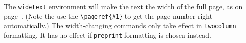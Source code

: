 \documentclass[%
 aip,
 amsmath,amssymb,
 reprint,%
]{revtex4-1}
\begin{document}
The \texttt{widetext} environment will make the text the width of the
full page, as on page~\pageref{eq:wideeq}. (Note the use the
\verb+\pageref{#1}+ to get the page number right automatically.) The
width-changing commands only take effect in \texttt{twocolumn}
formatting. It has no effect if \texttt{preprint} formatting is chosen
instead.

%
%
%
%
\end{document}
